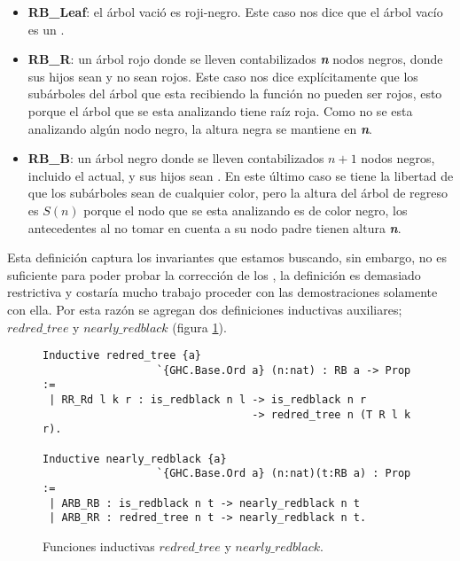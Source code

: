 \begin{itemize}
        \item \textbf{RB\_Leaf}: el árbol vació es roji-negro. Este caso nos dice que el \'arbol
        vacío es un {\arn}.
        \item \textbf{RB\_R}: un árbol rojo donde se lleven contabilizados \textbf{\textit{n}} nodos 
        negros, donde sus hijos sean {\arns} y no sean rojos. Este caso nos dice explícitamente que 
        los subárboles del árbol que esta recibiendo la función no pueden ser rojos, esto porque el 
        árbol que se esta analizando tiene raíz roja. Como no se esta analizando algún nodo negro, 
        la altura negra se mantiene en \textbf{\textit{n}}.
        \item \textbf{RB\_B}: un árbol negro donde se lleven contabilizados $n+1$ nodos negros, 
        incluido el actual, y sus hijos sean {\arns}. En este \'ultimo caso se tiene la libertad de 
        que los subárboles sean de cualquier color, pero la altura del \'arbol de regreso es $S(n)$ 
        porque el nodo que se esta analizando es de color negro, los antecedentes al no tomar en 
        cuenta a su nodo padre tienen altura \textbf{\textit{n}}.
\end{itemize}

Esta definici\'on captura los invariantes que estamos buscando, sin embargo, no es suficiente para
poder probar la correcci\'on de los {\arns}, la definici\'on es demasiado restrictiva y costaría 
mucho trabajo proceder con las demostraciones solamente con ella. Por esta razón se agregan dos
definiciones inductivas auxiliares; \hyperref[inductive_isRedB]{$redred\_tree$} y 
\hyperref[inductive_isRedB]{$nearly\_redblack$} (figura \ref{inductive_aux}).

\begin{figure}[!ht]
\centering
\captionsetup{justification=centering}
\begin{verbatim}
Inductive redred_tree {a}
                  `{GHC.Base.Ord a} (n:nat) : RB a -> Prop :=
 | RR_Rd l k r : is_redblack n l -> is_redblack n r
                                 -> redred_tree n (T R l k r).

Inductive nearly_redblack {a}
                  `{GHC.Base.Ord a} (n:nat)(t:RB a) : Prop :=
 | ARB_RB : is_redblack n t -> nearly_redblack n t
 | ARB_RR : redred_tree n t -> nearly_redblack n t.
\end{verbatim}
\caption{Funciones inductivas \hyperref[inductive_isRedB]{$redred\_tree$} y 
\hyperref[inductive_isRedB]{$nearly\_redblack$}.}
\label{inductive_aux}
\end{figure}

